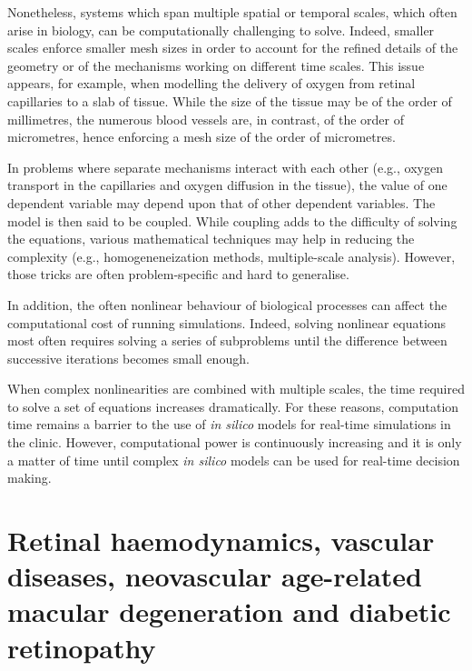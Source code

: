 \documentclass{article}
\begin{document}
Nonetheless, systems which span multiple spatial or temporal scales, which often arise in biology, can be computationally challenging to solve.
Indeed, smaller scales enforce smaller mesh sizes in order to account for the refined details of the geometry or of the mechanisms working on different time scales.
This issue appears, for example, when modelling the delivery of oxygen from retinal capillaries to a slab of tissue.
While the size of the tissue may be of the order of millimetres, the numerous blood vessels are, in contrast, of the order of micrometres, hence enforcing a mesh size of the order of micrometres.

In problems where separate mechanisms interact with each other (e.g., oxygen transport in the capillaries and oxygen diffusion in the tissue), the value of one dependent variable may depend upon that of other dependent variables.
The model is then said to be coupled.
While coupling adds to the difficulty of solving the equations, various mathematical techniques may help in reducing the complexity (e.g., homogeneneization methods, multiple-scale analysis).
However, those tricks are often problem-specific and hard to generalise.

In addition, the often nonlinear behaviour of biological processes can affect the computational cost of running simulations.
Indeed, solving nonlinear equations most often requires solving a series of subproblems until the difference between successive iterations becomes small enough.

When complex nonlinearities are combined with multiple scales, the time required to solve a set of equations increases dramatically.
For these reasons, computation time remains a barrier to the use of \textit{in silico} models for real-time simulations in the clinic.
However, computational power is continuously increasing and it is only a matter of time until complex \textit{in silico} models can be used for real-time decision making.





\section{Retinal haemodynamics, vascular diseases, neovascular age-related macular degeneration and diabetic retinopathy}\label{sec:RetinalHaemodynamicsNAMDDR}
\end{document}
